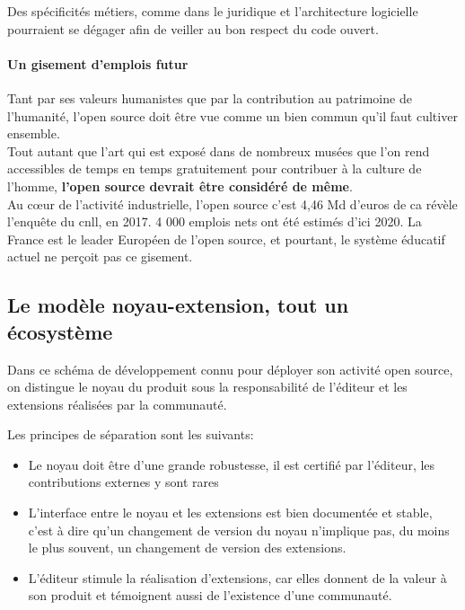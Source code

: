 					Des spécificités métiers, comme dans le juridique et l'architecture logicielle pourraient se dégager afin de veiller au bon respect du code ouvert.

				\paragraph{Un gisement d'emplois futur\\}

					Tant par ses valeurs humanistes que par la contribution au patrimoine de l'humanité, l'open source doit être vue comme un bien commun qu'il faut cultiver ensemble.\\
					
					Tout autant que l'art qui est exposé dans de nombreux musées que l'on rend accessibles de temps en temps gratuitement pour contribuer à la culture de l'homme, \textbf{l'open source devrait être considéré de même}.\\

					Au cœur de l'activité industrielle, l'open source c'est 4,46 Md d'euros de \acrfull{ca} révèle l'enquête du \acrfull{cnll}, en 2017. 4 000 emplois nets ont été estimés d'ici 2020. La France est le leader Européen de l'open source, et pourtant, le système éducatif actuel ne perçoit pas ce gisement. 

		\subsection{Le modèle noyau-extension, tout un écosystème}
			
			 Dans ce schéma de développement connu pour déployer son activité open source, on distingue le noyau du produit sous la responsabilité de l'éditeur et les extensions réalisées par la communauté.

				Les principes de séparation sont les suivants:

				\begin{itemize}[label=\textbullet, font=\LARGE \color{burntorange}]
					\item Le noyau doit être d'une grande robustesse, il est certifié par l'éditeur, les contributions externes y sont rares
					\item L'interface entre le noyau et les extensions est bien documentée et stable, c'est à dire qu'un changement de version du noyau n'implique pas, du moins le plus souvent, un changement de version des extensions.	
					\item L'éditeur stimule la réalisation d'extensions, car elles donnent de la valeur à son produit et témoignent aussi de l'existence d'une communauté.
				\end{itemize}

